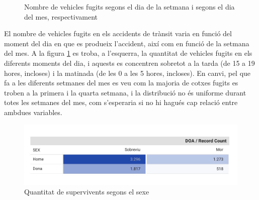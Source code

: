 \documentclass[12pt,longbibliography]{article}
\theoremstyle{definition}
\theoremstyle{remark}
\begin{document}
\begin{figure}[h!]
\par
{}%
\hfill
{}%
\par

\caption{Nombre de vehicles fugits segons el dia de la setmana i segons el dia del mes, respectivament}
\label{fig:G4}
\end{figure}

El nombre de vehicles fugits en els accidents de trànsit varia en funció del moment del dia en que es produeix l'accident, així com en funció de la setmana del mes. A la figura \ref{fig:G4} es troba, a l'esquerra, la quantitat de vehicles fugits en els diferents moments del dia, i aquests es concentren sobretot a la tarda (de 15 a 19 hores, incloses) i la matinada (de les 0 a les 5 hores, incloses). En canvi, pel que fa a les diferents setmanes del mes es veu com la majoria de cotxes fugits es troben a la primera i la quarta setmana, i la distribució no és uniforme durant totes les setmanes del mes, com s'esperaria si no hi hagués cap relació entre ambdues variables.

\begin{figure}[H]
\begin{center}
\includegraphics[width=15cm]{Table1}
\end{center}
\caption{Quantitat de supervivents segons el sexe}
\label{fig:G5}
\end{figure}
\end{document}
